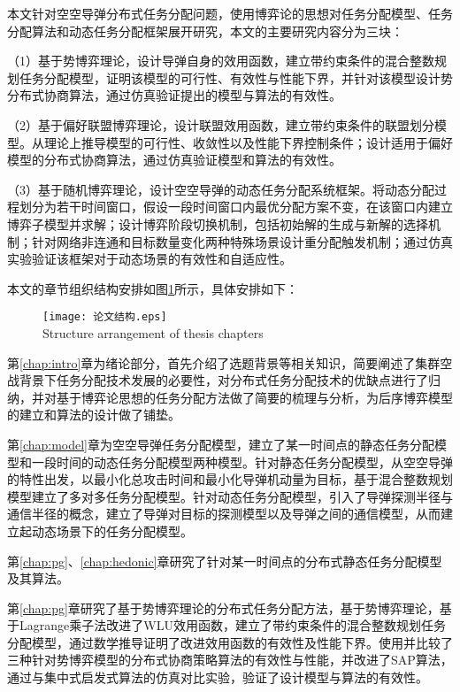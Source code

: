 本文针对空空导弹分布式任务分配问题，使用博弈论的思想对任务分配模型、任务分配算法和动态任务分配框架展开研究，本文的主要研究内容分为三块：

（1）基于势博弈理论，设计导弹自身的效用函数，建立带约束条件的混合整数规划任务分配模型，证明该模型的可行性、有效性与性能下界，并针对该模型设计势分布式协商算法，通过仿真验证提出的模型与算法的有效性。

（2）基于偏好联盟博弈理论，设计联盟效用函数，建立带约束条件的联盟划分模型。从理论上推导模型的可行性、收敛性以及性能下界控制条件；设计适用于偏好模型的分布式协商算法，通过仿真验证模型和算法的有效性。

（3）基于随机博弈理论，设计空空导弹的动态任务分配系统框架。将动态分配过程划分为若干时间窗口，假设一段时间窗口内最优分配方案不变，在该窗口内建立博弈子模型并求解；设计博弈阶段切换机制，包括初始解的生成与新解的选择机制；针对网络非连通和目标数量变化两种特殊场景设计重分配触发机制；通过仿真实验验证该框架对于动态场景的有效性和自适应性。

本文的章节组织结构安排如图\ref{fig:structure}所示，具体安排如下：

\begin{figure}[htp]
  \centering
  \texttt{[image: 论文结构.eps]} \\
    {Structure arrangement of thesis chapters}
 \label{fig:structure}
\end{figure}

第\ref{chap:intro}章为绪论部分，首先介绍了选题背景等相关知识，简要阐述了集群空战背景下任务分配技术发展的必要性，对分布式任务分配技术的优缺点进行了归纳，并对基于博弈论思想的任务分配方法做了简要的梳理与分析，为后序博弈模型的建立和算法的设计做了铺垫。

第\ref{chap:model}章为空空导弹任务分配模型，建立了某一时间点的静态任务分配模型和一段时间的动态任务分配模型两种模型。针对静态任务分配模型，从空空导弹的特性出发，以最小化总攻击时间和最小化导弹机动量为目标，基于混合整数规划模型建立了多对多任务分配模型。针对动态任务分配模型，引入了导弹探测半径与通信半径的概念，建立了导弹对目标的探测模型以及导弹之间的通信模型，从而建立起动态场景下的任务分配模型。

第\ref{chap:pg}、\ref{chap:hedonic}章研究了针对某一时间点的分布式静态任务分配模型及其算法。

第\ref{chap:pg}章研究了基于势博弈理论的分布式任务分配方法，基于势博弈理论，基于Lagrange乘子法改进了WLU效用函数，建立了带约束条件的混合整数规划任务分配模型，通过数学推导证明了改进效用函数的有效性及性能下界。使用并比较了三种针对势博弈模型的分布式协商策略算法的有效性与性能，并改进了SAP算法，通过与集中式启发式算法的仿真对比实验，验证了设计模型与算法的有效性。

